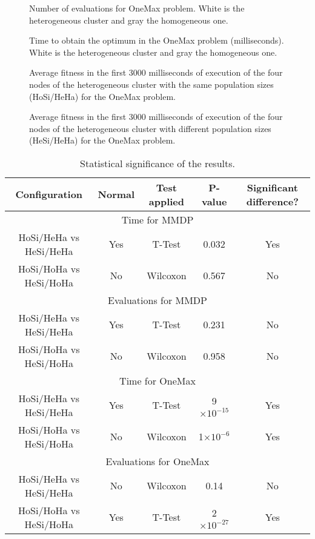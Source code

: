 \documentclass{sig-alternate}
\providecommand{\e}[1]{\ensuremath{\times 10^{#1}}}
\begin{document}
\begin{figure}
\centering
{}
\caption{Number of evaluations for OneMax problem. White is the heterogeneous cluster and gray the homogeneous one.}
\label{fig:evalsOneMax}
\end{figure}

\begin{figure}
\centering
{}
\caption{Time to obtain the optimum in the OneMax problem (milliseconds). White is the heterogeneous cluster and gray the homogeneous one.}
\label{fig:timeOneMax}
\end{figure}

\begin{figure*}
\centering
{}
\caption{Average fitness in the first 3000 milliseconds of execution of the four nodes of the heterogeneous cluster with the same population sizes (HoSi/HeHa) for the OneMax problem.}
\label{fig:gensonemaxhomosize}
\end{figure*}

\begin{figure*}
\centering
{}
\caption{Average fitness in the first 3000 milliseconds of execution of the four nodes of the heterogeneous cluster with different population sizes (HeSi/HeHa) for the OneMax problem.}
\label{fig:gensonemaxheterosize}
\end{figure*}

\begin{table*}
\centering
\caption{Statistical significance of the results.}
\begin{tabular}{|c|c|c|c|c|} \hline

Configuration			&Normal	&Test applied			&P-value & Significant difference?\\ \hline
\multicolumn{5}{|c|}{Time for MMDP} \\ \hline
HoSi/HeHa vs HeSi/HeHa	&Yes	&T-Test			& 0.032 	 & Yes \\ \hline
HoSi/HoHa vs HeSi/HoHa	&No		&Wilcoxon		&0.567 	 & No \\ \hline \hline
\multicolumn{5}{|c|}{Evaluations for MMDP}	\\ \hline
HoSi/HeHa vs HeSi/HeHa	&Yes	&T-Test			&0.231  & No \\ \hline
HoSi/HoHa vs HeSi/HoHa	&No		&Wilcoxon		&0.958  & No \\ \hline \hline
\multicolumn{5}{|c|}{Time for OneMax} \\ \hline
HoSi/HeHa vs HeSi/HeHa	& Yes	& T-Test		&  9\e{-15} & Yes \\ \hline
HoSi/HoHa vs HeSi/HoHa	& No	& Wilcoxon		& 	1\e{-6} & Yes \\ \hline \hline
\multicolumn{5}{|c|}{Evaluations for OneMax}	\\ \hline
HoSi/HeHa vs HeSi/HeHa	& No	& Wilcoxon 		&	0.14 		& No\\ \hline
HoSi/HoHa vs HeSi/HoHa	& Yes	& T-Test		&	2\e{-27}	& Yes \\ \hline
\end{tabular}
\label{tab:significance}
\end{table*}
\end{document}
